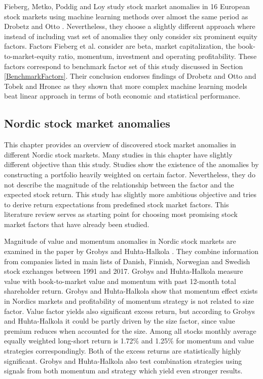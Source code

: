 \documentclass{article}
\begin{document}
Fieberg, Metko, Poddig and Loy \citeyear{Fieberg} study stock market anomalies in 16 European stock markets using machine learning methods over almost the same period as Drobetz and Otto \citeyear{Drobetz}\footnotemark. Nevertheless, they choose a slightly different approach where instead of including vast set of anomalies they only consider six prominent equity factors. Factors Fieberg et al. consider are beta, market capitalization, the book-to-market-equity ratio, momentum, investment and operating profitability. These factors correspond to benchmark factor set of this study discussed in Section \ref{BenchmarkFactors}. Their conclusion endorses findings of Drobetz and Otto \citeyear{Drobetz} and Tobek and Hronec \citeyear{TOBEK2021100588} as they shown that more complex machine learning models beat linear approach in terms of both economic and statistical performance. \par


\subsection{Nordic stock market anomalies}\label{NordicStockMarketAnomalies}

This chapter provides an overview of discovered stock market anomalies in different Nordic stock markets. Many studies in this chapter have slightly different objective than this study. Studies show the existence of the anomalies by constructing a portfolio heavily weighted on certain factor. Nevertheless, they do not describe the magnitude of the relationship between the factor and the expected stock return. This study has slightly more ambitious objective and tries to derive return expectations from predefined stock market factors. This literature review serves as starting point for choosing most promising stock market factors that have already been studied. \par

Magnitude of value and momentum anomalies in Nordic stock markets are examined in the paper by Grobys and Huhta-Halkola \citeyear{grobys}. They combine information from companies listed in main lists of Danish, Finnish, Norwegian and Swedish stock exchanges between 1991 and 2017. Grobys and Huhta-Halkola measure value with book-to-market value and momentum with past 12-month total shareholder return. Grobys and Huhta-Halkola show that momentum effect exists in Nordics markets and profitability of momentum strategy is not related to size factor. Value factor yields also significant excess return, but according to Grobys and Huhta-Halkola it could be partly driven by the size factor, since value premium reduces when accounted for the size. Among all stocks monthly average equally weighted long-short return is 1.72\% and 1.25\% for momentum and value strategies correspondingly. Both of the excess returns are statistically highly significant. Grobys and Huhta-Halkola also test combination strategies using signals from both momentum and strategy which yield even stronger results. \par
\end{document}
